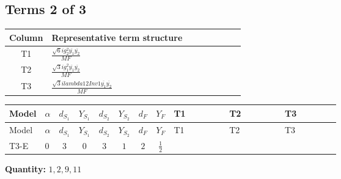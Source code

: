\documentclass[8pt]{article}
\begin{document}
\begin{landscape}
\subsection*{Terms 2 of 3}
\begin{center}
\begin{tabular}{@{}c >{\raggedright\arraybackslash}p{0.82\linewidth}@{}}
\toprule
Column & Representative term structure \\
\midrule
T1 & \(\displaystyle \frac{\sqrt{6} i g_{2}^{2} \overline{y_{1}} \overline{y_{2}}}{MF}\) \\
\midrule
T2 & \(\displaystyle \frac{\sqrt{3} i g_{1}^{2} \overline{y_{1}} \overline{y_{2}}}{MF}\) \\
\midrule
T3 & \(\displaystyle \frac{\sqrt{3} i lambda12Inv1 \overline{y_{1}} \overline{y_{2}}}{MF}\) \\
\midrule
\bottomrule
\end{tabular}
\end{center}
\smallskip
\tiny
\begin{longtable}{@{}llcccccc >{\raggedright\arraybackslash}p{0.21\linewidth} >{\raggedright\arraybackslash}p{0.21\linewidth} >{\raggedright\arraybackslash}p{0.21\linewidth}@{}}
\toprule
Model & $\alpha$ & $d_{S_1}$ & $Y_{S_1}$ & $d_{S_2}$ & $Y_{S_2}$ & $d_F$ & $Y_F$ & T1 & T2 & T3 \\
\midrule
\endfirsthead
\toprule
Model & $\alpha$ & $d_{S_1}$ & $Y_{S_1}$ & $d_{S_2}$ & $Y_{S_2}$ & $d_F$ & $Y_F$ & T1 & T2 & T3 \\
\midrule
\endhead
T3-E & $0$ & $3$ & $0$ & $3$ & $1$ & $2$ & $\frac{1}{2}$ & \scriptsize\adjustbox{max width=\linewidth}{$\begin{gathered} - \frac{\sqrt{6} i g_{2}^{2} \overline{y_{1}} \overline{y_{2}}}{6 MF}\end{gathered}$} & \scriptsize\adjustbox{max width=\linewidth}{$\begin{gathered} - \frac{\sqrt{3} i g_{1}^{2} \overline{y_{1}} \overline{y_{2}}}{8 MF}\end{gathered}$} & \scriptsize\adjustbox{max width=\linewidth}{$\begin{gathered} \frac{\sqrt{3} i lambda12Inv1 \overline{y_{1}} \overline{y_{2}}}{6 MF}\end{gathered}$} \\
\midrule
\bottomrule
\end{longtable}
\clearpage
\noindent\textbf{Quantity: }$\mathrm{1,2,9,11}$\par\smallskip

\end{landscape}
\end{document}
